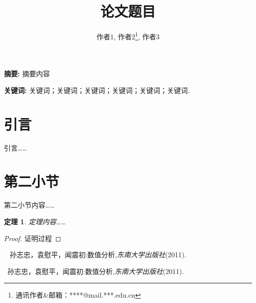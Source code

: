 \documentclass{article}
\begin{document}
\begin{CJK}{GBK}{song}
\newtheorem{theorem}{定理}[section]
\newtheorem{assumption}{假设}[section]
\newtheorem{corollary}{推论}[section]
\newtheorem{proposition}{命题}[section]
\newtheorem{lemma}{引理}[section]
\newtheorem{definition}{定义}[section]
\newtheorem{assum}{假设}[section]
\newtheorem{algo}{算法}[section]
\newtheorem{remark}{注}[section]






\title{\centering\textbf{论文题目}}
\author{作者1, 作者2\thanks{通讯作者\&邮箱：****@mail.***.edu.cn}, 作者3}
\date{}
\maketitle
{\bf 摘要:} 摘要内容
\vspace{0.5cm}


\begin{flushleft}
{\bf 关键词:} 关键词；关键词；关键词；关键词；关键词；关键词.
\par
\end{flushleft}
\vspace*{12mm}%




\section{引言}


引言……






\vspace*{12mm}%


\section{第二小节}


第二小节内容……




\begin{theorem}
定理内容……
\end{theorem}


\begin{proof}
证明过程
\end{proof}



\vspace*{12mm}%

\begin{thebibliography}{1} 
孙志忠，袁慰平，闻震初:数值分析,\emph{东南大学出版社}(2011). 
\end{thebibliography}
\begin{thebibliography}{1} 孙志忠，袁慰平，闻震初:数值分析,\emph{东南大学出版社}(2011). \end{thebibliography}



\end{CJK}
\end{document}
